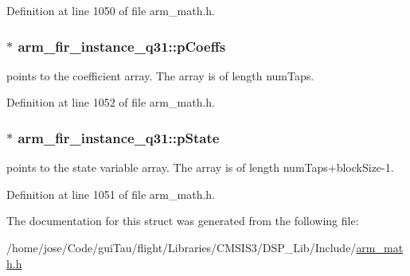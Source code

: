 Definition at line 1050 of file arm\-\_\-math.\-h.

\hypertarget{structarm__fir__instance__q31_afaae4c884bdf11a4ec2f3b9bb2bb51d0}{
\subsubsection[{p\-Coeffs}]{$\ast$ arm\-\_\-fir\-\_\-instance\-\_\-q31\-::p\-Coeffs}}\label{structarm__fir__instance__q31_afaae4c884bdf11a4ec2f3b9bb2bb51d0}
points to the coefficient array. The array is of length num\-Taps. 

Definition at line 1052 of file arm\-\_\-math.\-h.

\hypertarget{structarm__fir__instance__q31_a409f39c93b744784648bdc365541444d}{
\subsubsection[{p\-State}]{$\ast$ arm\-\_\-fir\-\_\-instance\-\_\-q31\-::p\-State}}\label{structarm__fir__instance__q31_a409f39c93b744784648bdc365541444d}
points to the state variable array. The array is of length num\-Taps+block\-Size-\/1. 

Definition at line 1051 of file arm\-\_\-math.\-h.



The documentation for this struct was generated from the following file\-:\begin{DoxyCompactItemize}
\item 
/home/jose/\-Code/gui\-Tau/flight/\-Libraries/\-C\-M\-S\-I\-S3/\-D\-S\-P\-\_\-\-Lib/\-Include/\hyperlink{arm__math_8h}{arm\-\_\-math.\-h}\end{DoxyCompactItemize}

